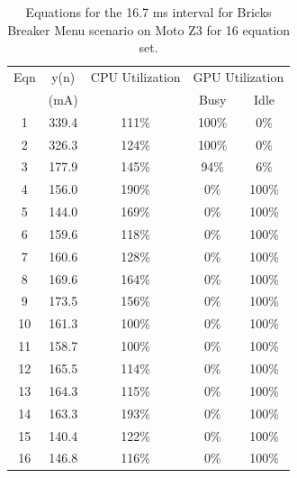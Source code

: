 \begin{table}[tb]
    \centering
    \caption{Equations for the 16.7 ms interval for Bricks Breaker Menu scenario on Moto Z3 for 16 equation set.}
    {\small
    \begin{tabular}{|c|c|c|c|c|}
        \hline
            Eqn & y(n) & \multicolumn{1}{c|}{CPU Utilization} & \multicolumn{2}{c|}{GPU Utilization} \\
        \cline{4-5}
            & (mA) & \multicolumn{1}{c|}{} & Busy & Idle \\
        \hline
               1 & 339.4 & 111\% & 100\% &   0\% \\
               2 & 326.3 & 124\% & 100\% &   0\% \\
               3 & 177.9 & 145\% &  94\% &   6\% \\
               4 & 156.0 & 190\% &   0\% & 100\% \\
               5 & 144.0 & 169\% &   0\% & 100\% \\
               6 & 159.6 & 118\% &   0\% & 100\% \\
               7 & 160.6 & 128\% &   0\% & 100\% \\
               8 & 169.6 & 164\% &   0\% & 100\% \\
               9 & 173.5 & 156\% &   0\% & 100\% \\
              10 & 161.3 & 100\% &   0\% & 100\% \\
              11 & 158.7 & 100\% &   0\% & 100\% \\
              12 & 165.5 & 114\% &   0\% & 100\% \\
              13 & 164.3 & 115\% &   0\% & 100\% \\
              14 & 163.3 & 193\% &   0\% & 100\% \\
              15 & 140.4 & 122\% &   0\% & 100\% \\
              16 & 146.8 & 116\% &   0\% & 100\% \\
        \hline
    \end{tabular}
    }
    \label{tab:equations_nano}
    \vspace{-0.1in}
\end{table}


